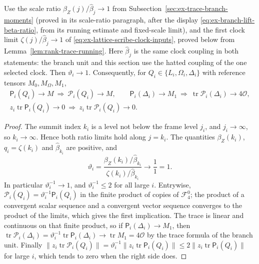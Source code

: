 \begin{lemma}
\label{lem:ex-lattice-scribe-normalization-ratio}
Use the scale ratio $\beta_Z(j)/\widehat\beta_j\to1$ from Subsection~\ref{sec:ex-trace-branch-moments} (proved in its scale-ratio paragraph, after the display
\eqref{eq:ex-branch-lift-beta-ratio}, from its running estimate and
fixed-scale limit), and the first clock limit
$\zeta(j)/\widehat\beta_j\to1$ of
\eqref{eq:ex-lattice-scribe-clock-inputs}, proved below from
Lemma~\ref{lem:rank-trace-running}. Here $\widehat\beta_j$ is the
same clock coupling in both statements: the branch unit and this section
use the hatted coupling of the one selected clock. Then $\vartheta_i\to1$.
Consequently, for $Q_i\in\{L_i,\Omega_i,\Delta_i\}$ with reference
tensors $M_0,M_\Omega,M_1$,
\begin{gather*}
 \mathsf P_i(Q_i)\to M\ \Longrightarrow\ \mathcal P_i(Q_i)\to M,
 \qquad
 \mathsf P_i(\Delta_i)\to M_1\ \Longrightarrow\
 \operatorname{tr}\mathcal P_i(\Delta_i)\to4\mathcal O,\\
 z_i\operatorname{tr}\mathsf P_i(Q_i)\to0\ \Longrightarrow\
 z_i\operatorname{tr}\mathcal P_i(Q_i)\to0 .
\end{gather*}
\end{lemma}
\begin{proof}
The summit index $k_i$ is a level not below the frame level $j_i$, and
$j_i\to\infty$, so $k_i\to\infty$. Hence both ratio limits hold along
$j=k_i$. The quantities $\beta_Z(k_i)$, $q_i=\zeta(k_i)$ and
$\widehat\beta_{k_i}$ are positive, and
\[
 \vartheta_i=\frac{\beta_Z(k_i)/\widehat\beta_{k_i}}
               {\zeta(k_i)/\widehat\beta_{k_i}}
 \longrightarrow\frac11=1 .
\]
In particular $\vartheta_i^{-1}\to1$, and $\vartheta_i^{-1}\le2$ for all
large $i$. Entrywise, $\mathcal P_i(Q_i)=\vartheta_i^{-1}\mathsf P_i(Q_i)$
in the finite product of copies of $\mathcal F_4^0$; the product of a
convergent scalar sequence and a convergent vector sequence converges to
the product of the limits, which gives the first implication. The trace is
linear and continuous on that finite product, so
if $\mathsf P_i(\Delta_i)\to M_1$, then
$\operatorname{tr}\mathcal P_i(\Delta_i)=\vartheta_i^{-1}
\operatorname{tr}\mathsf P_i(\Delta_i)\to\operatorname{tr}M_1
=4\mathcal O$ by the trace formula of the branch unit. Finally
$\|z_i\operatorname{tr}\mathcal P_i(Q_i)\|
=\vartheta_i^{-1}\|z_i\operatorname{tr}\mathsf P_i(Q_i)\|
\le2\|z_i\operatorname{tr}\mathsf P_i(Q_i)\|$ for large $i$, which tends
to zero when the right side does.
\end{proof}

